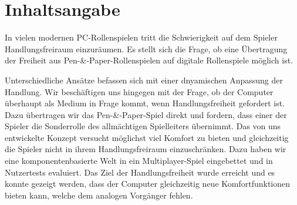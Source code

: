 \chapter*{Inhaltsangabe}

In vielen modernen PC-Rollenspielen tritt die Schwierigkeit auf dem Spieler Handlungsfreiraum einzuräumen. Es stellt sich die Frage, ob eine Übertragung der Freiheit aus Pen-\&-Paper-Rollenspielen auf digitale Rollenspiele möglich ist.

Unterschiedliche Ansätze befassen sich mit einer dnyamischen Anpassung der Handlung. Wir beschäftigen uns hingegen mit der Frage, ob der Computer überhaupt als Medium in Frage kommt, wenn Handlungsfreiheit gefordert ist. Dazu übertragen wir das Pen-\&-Paper-Spiel direkt und fordern, dass einer der Spieler die Sonderrolle des allmächtigen Spielleiters übernimmt. Das von uns entwickelte Konzept versucht möglichst viel Komfort zu bieten und gleichzeitig die Spieler nicht in ihrem Handlungsfreiraum einzuschränken. Dazu haben wir eine komponentenbasierte Welt in ein Multiplayer-Spiel eingebettet und in Nutzertests evaluiert. Das Ziel der Handlungsfreiheit wurde erreicht und es konnte gezeigt werden, dass der Computer gleichzeitig neue Komfortfunktionen bieten kann, welche dem analogen Vorgänger fehlen.
